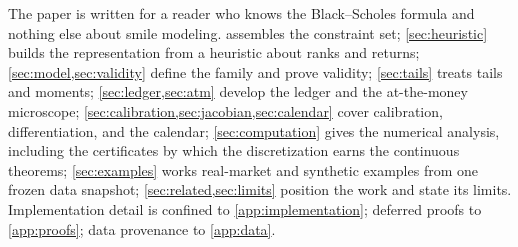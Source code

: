 The paper is written for a reader who knows the Black--Scholes formula and
nothing else about smile modeling.   assembles the
constraint set; \cref{sec:heuristic} builds the representation from a
heuristic about ranks and returns; \cref{sec:model,sec:validity} define the
family and prove validity; \cref{sec:tails} treats tails and moments;
\cref{sec:ledger,sec:atm} develop the ledger and the at-the-money
microscope; \cref{sec:calibration,sec:jacobian,sec:calendar} cover
calibration, differentiation, and the calendar; \cref{sec:computation}
gives the numerical analysis, including the certificates by which the
discretization earns the continuous theorems; \cref{sec:examples} works
real-market and synthetic examples from one frozen data snapshot;
\cref{sec:related,sec:limits} position the work and state its limits.
Implementation detail is confined to \cref{app:implementation}; deferred
proofs to \cref{app:proofs}; data provenance to \cref{app:data}.

